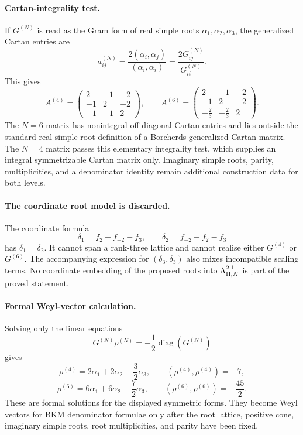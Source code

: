 \paragraph{Cartan-integrality test.}
If $G^{(N)}$ is read as the Gram form of real simple roots
$\alpha_1,\alpha_2,\alpha_3$, the generalized Cartan entries are
\[
  a^{(N)}_{ij}
  = \frac{2(\alpha_i,\alpha_j)}{(\alpha_i,\alpha_i)}
  = \frac{2G^{(N)}_{ij}}{G^{(N)}_{ii}} .
\]
This gives
\[
  A^{(4)} =
  \begin{pmatrix}
    2 & -1 & -2\\
    -1 & 2 & -2\\
    -1 & -1 & 2
  \end{pmatrix},
  \qquad
  A^{(6)} =
  \begin{pmatrix}
    2 & -1 & -2\\
    -1 & 2 & -2\\
    -\frac{2}{3} & -\frac{2}{3} & 2
  \end{pmatrix}.
\]
The $N=6$ matrix has nonintegral off-diagonal Cartan entries and lies
outside the standard real-simple-root definition of a Borcherds
generalized Cartan matrix. The $N=4$ matrix passes this elementary
integrality test, which supplies an integral symmetrizable Cartan matrix
only. Imaginary simple roots, parity, multiplicities, and a denominator
identity remain additional construction data for both levels.

\paragraph{The coordinate root model is discarded.}
The coordinate formula
\[
  \delta_1=f_2+f_{-2}-f_3,\qquad
  \delta_2=f_{-2}+f_2-f_3
\]
has $\delta_1=\delta_2$. It cannot span a rank-three lattice and cannot
realise either $G^{(4)}$ or $G^{(6)}$. The accompanying expression for
$(\delta_3,\delta_3)$ also mixes incompatible scaling terms. No
coordinate embedding of the proposed roots into $\Lambda^{2,1}_{\mathrm{II},N}$ is part of the
proved statement.

\paragraph{Formal Weyl-vector calculation.}
Solving only the linear equations
\[
  G^{(N)}\rho^{(N)}
  = -\frac{1}{2}\operatorname{diag}(G^{(N)})
\]
gives
\[
  \rho^{(4)}
  = 2\alpha_1+2\alpha_2+\frac{3}{2}\alpha_3,\qquad
  (\rho^{(4)},\rho^{(4)})=-7,
\]
\[
  \rho^{(6)}
  = 6\alpha_1+6\alpha_2+\frac{7}{2}\alpha_3,\qquad
  (\rho^{(6)},\rho^{(6)})=-\frac{45}{2}.
\]
These are formal solutions for the displayed symmetric forms. They
become Weyl vectors for BKM denominator formulae only after the root
lattice, positive cone, imaginary simple roots, root multiplicities,
and parity have been fixed.

